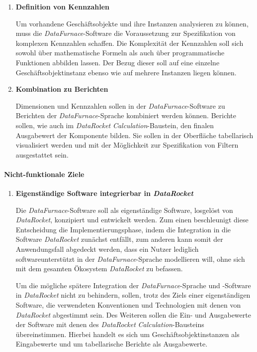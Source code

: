 \documentclass[
  language=german, %
  type=bachelor,%
  ngerman
]{isthesis}
\begin{document}
\begin{content}
\begin{enumerate}
    \item \textbf{Definition von Kennzahlen}

      Um vorhandene Geschäftsobjekte und ihre Instanzen analysieren zu können,
      muss die \textit{DataFurnace}-Software die Voraussetzung zur
      Spezifikation von komplexen Kennzahlen schaffen. Die Komplexität der
      Kennzahlen soll sich sowohl über mathematische Formeln als auch
      über programmatische Funktionen abbilden lassen. Der Bezug dieser soll auf
      eine einzelne Geschäftsobjektinstanz ebenso wie auf mehrere Instanzen
      liegen können.

    \item \textbf{Kombination zu Berichten}

      Dimensionen und Kennzahlen sollen in der \textit{DataFurnace}-Software zu
      Berichten der \textit{DataFurnace}-Sprache kombiniert werden können.
      Berichte sollen, wie auch im \textit{DataRocket}
      \textit{Calculation}-Baustein, den finalen Ausgabewert der Komponente
      bilden. Sie sollen in der Oberfläche tabellarisch visualisiert werden und
      mit der Möglichkeit zur Spezifikation von Filtern ausgestattet sein.

  \end{enumerate}

  \paragraph{Nicht-funktionale Ziele}
  \begin{enumerate}

    \item \textbf{Eigenständige Software integrierbar in \textit{DataRocket}}

      Die \textit{DataFurnace}-Software soll als eigenständige Software,
      losgelöst von \textit{DataRocket}, konzipiert und entwickelt werden. Zum
      einen beschleunigt diese Entscheidung die Implementierungsphase, indem
      die Integration in die Software \textit{DataRocket} zunächst entfällt,
      zum anderen kann somit der Anwendungsfall abgedeckt werden, dass ein Nutzer
      lediglich softwareunterstützt in der \textit{DataFurnace}-Sprache
      modellieren will, ohne sich mit dem gesamten Ökosystem
      \textit{DataRocket} zu befassen.

      Um die mögliche spätere Integration der \textit{DataFurnace}-Sprache und
      -Software in \textit{DataRocket} nicht zu behindern, sollen, trotz des
      Ziels einer eigenständigen Software, die verwendeten Konventionen und
      Technologien mit denen von \textit{DataRocket} abgestimmt sein.  Des
      Weiteren sollen die Ein- und Ausgabewerte der Software mit denen des
      \textit{DataRocket} \textit{Calculation}-Bausteins übereinstimmen.
      Hierbei handelt es sich um Geschäftsobjektinstanzen als Eingabewerte und
      um tabellarische Berichte als Ausgabewerte.


\end{enumerate}
\end{content}
\end{document}
